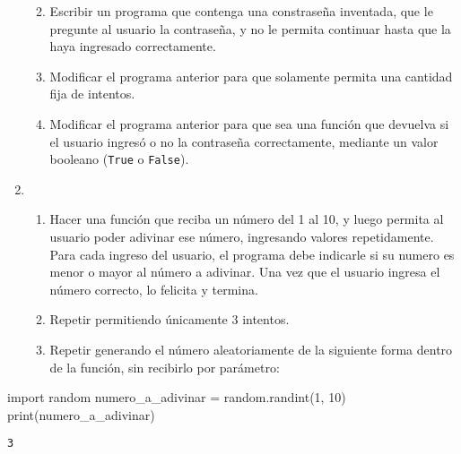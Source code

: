 \documentclass[
  letterpaper,
  DIV=11,
  numbers=noendperiod]{scrreprt}
\newenvironment{Shaded}{\begin{snugshade}}{\end{snugshade}}
\newcommand{\BuiltInTok}[1]{\textcolor[rgb]{0.00,0.23,0.31}{#1}}
\newcommand{\DecValTok}[1]{\textcolor[rgb]{0.68,0.00,0.00}{#1}}
\newcommand{\ImportTok}[1]{\textcolor[rgb]{0.00,0.46,0.62}{#1}}
\newcommand{\NormalTok}[1]{\textcolor[rgb]{0.00,0.23,0.31}{#1}}
\newcommand{\OperatorTok}[1]{\textcolor[rgb]{0.37,0.37,0.37}{#1}}
\providecommand{\tightlist}{%
  \setlength{\itemsep}{0pt}\setlength{\parskip}{0pt}}\usepackage{longtable,booktabs,array}
\begin{document}
\begin{enumerate}
  \begin{enumerate}
  \def\labelenumii{\alph{enumii}.}
  \tightlist
  \item
    Escribir un programa que contenga una constraseña inventada, que le
    pregunte al usuario la contraseña, y no le permita continuar hasta
    que la haya ingresado correctamente.
  \item
    Modificar el programa anterior para que solamente permita una
    cantidad fija de intentos.
  \item
    Modificar el programa anterior para que sea una función que devuelva
    si el usuario ingresó o no la contraseña correctamente, mediante un
    valor booleano (\texttt{True} o \texttt{False}).
  \end{enumerate}
\item
  \begin{enumerate}
  \def\labelenumii{\alph{enumii}.}
  \item
    Hacer una función que reciba un número del 1 al 10, y luego permita
    al usuario poder adivinar ese número, ingresando valores
    repetidamente. Para cada ingreso del usuario, el programa debe
    indicarle si su numero es menor o mayor al número a adivinar. Una
    vez que el usuario ingresa el número correcto, lo felicita y
    termina.
  \item
    Repetir permitiendo únicamente 3 intentos.
  \item
    Repetir generando el número aleatoriamente de la siguiente forma
    dentro de la función, sin recibirlo por parámetro:
  \end{enumerate}
\end{enumerate}

\begin{Shaded}
\begin{Highlighting}[]
\ImportTok{import}\NormalTok{ random}
\NormalTok{numero\_a\_adivinar }\OperatorTok{=}\NormalTok{ random.randint(}\DecValTok{1}\NormalTok{, }\DecValTok{10}\NormalTok{)}
\BuiltInTok{print}\NormalTok{(numero\_a\_adivinar)}
\end{Highlighting}
\end{Shaded}

\begin{verbatim}
3
\end{verbatim}
\end{document}

